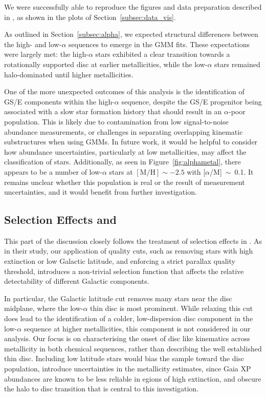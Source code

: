 \documentclass[a4paper,12pt]{article}
\begin{document}
We were successfully able to reproduce the figures and data preparation described in \citet{Vis2024}, as shown in the plots of 
Section~\ref{subsec:data_vis}.

As outlined in Section~\ref{subsec:alpha}, we expected structural differences between the high- and low-$\alpha$ sequences 
to emerge in the GMM fits. These expectations were largely met: the high-$\alpha$ stars exhibited a clear transition 
towards a rotationally supported disc at earlier metallicities, while the low-$\alpha$ stars remained halo-dominated 
until higher metallicities.

One of the more unexpected outcomes of this analysis is the identification of GS/E components within the 
high-$\alpha$ sequence, despite the GS/E progenitor being associated with a slow star formation 
history that should result in an $\alpha$-poor population. This is likely due to contamination from 
low signal-to-noise abundance measurements, or challenges in separating overlapping kinematic substructures 
when using GMMs. In future work, it would be helpful to consider how abundance uncertainties, particularly at low 
metallicities, may affect the classification of stars. Additionally, as seen in Figure~\ref{fig:alphametal}, 
there appears to be a number of low-$\alpha$ stars at $[\mathrm{M/H}]\sim-2.5$ with 
[$\alpha$/M]~$\sim$~0.1. It remains unclear whether this population is real or the result of measurement 
uncertainties, and it would benefit from further investigation.


\subsection{Selection Effects and} \label{subsec:selection_effects}

This part of the discussion closely follows the treatment of selection effects in 
\citet{zhang2024existencemetalpoordiscmilky}. As in their study, our application of quality cuts, such 
as removing stars with high extinction or low Galactic latitude, and enforcing a strict parallax quality 
threshold, introduces a non-trivial selection function that affects the relative detectability of 
different Galactic components.

In particular, the Galactic latitude cut removes many stars near the disc midplane, where the 
low-$\alpha$ thin disc is most prominent. While relaxing this cut does lead to the identification of a
colder, low-dispersion disc component in the low-$\alpha$ sequence at higher metallicities, this 
component is not considered in our analysis. Our focus is on characterising the onset of disc like 
kinematics across metallicity in both chemical sequences, rather than describing the well established 
thin disc. Including low latitude stars would bias the sample toward the disc population, introduce 
uncertainties in the metallicity estimates, since Gaia XP abundances are known to be less reliable in 
egions of high extinction, and obscure the halo to disc transition that is central to this investigation.
\end{document}

